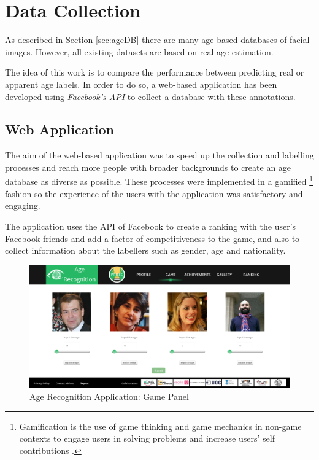 \chapter{Data Collection} \label{chap:data}

As described in Section \ref{sec:ageDB} there are many age-based databases of facial images. However, all existing datasets are based on real age estimation. 

The idea of this work is to compare the performance between predicting real or apparent age labels. In order to do so, a web-based application has been developed using \textit{Facebook's API} to collect a database with these annotations.


\section{Web Application}

The aim of the web-based application was to speed up the collection and labelling processes and reach more people with broader backgrounds to create an age database as diverse as possible. These processes were implemented in a gamified \footnote{Gamification is the use of game thinking and game mechanics in non-game contexts to engage users in solving problems and increase users' self contributions \cite{Deterding:2011:GDE:2181037.2181040}.} fashion so the experience of the users with the application was satisfactory and engaging. 

The application uses the API of Facebook to create a ranking with the user's Facebook friends and add a factor of competitiveness to the game, and also to collect information about the labellers such as gender, age and nationality.

\begin{figure}[!h]
	\centering
	\includegraphics[width=\textwidth]{figures/age_app_1}
	\caption{Age Recognition Application: Game Panel}
	\label{fig:game}
\end{figure}

